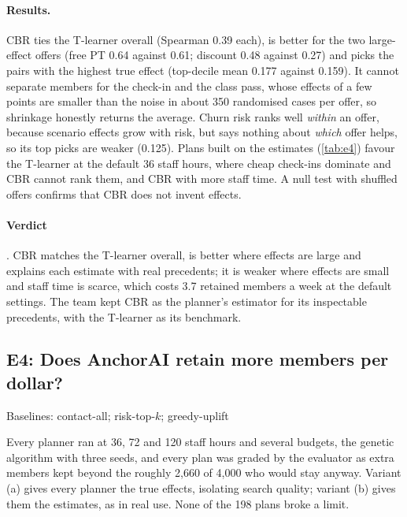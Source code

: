 \documentclass[paper=a4, fontsize=11pt, open=any, parskip=half-,
  headings=small, numbers=noenddot, captions=tableheading, toc=flat]{scrreprt}
\begin{document}
\paragraph{Results.} CBR ties the T-learner overall (Spearman 0.39 each), is better for the two large-effect offers (free PT 0.64 against 0.61; discount 0.48 against 0.27) and picks the pairs with the highest true effect (top-decile mean 0.177 against 0.159). It cannot separate members for the check-in and the class pass, whose effects of a few points are smaller than the noise in about 350 randomised cases per offer, so shrinkage honestly returns the average. Churn risk ranks well \emph{within} an offer, because scenario effects grow with risk, but says nothing about \emph{which} offer helps, so its top picks are weaker (0.125). Plans built on the estimates (\cref{tab:e4}) favour the T-learner at the default 36 staff hours, where cheap check-ins dominate and CBR cannot rank them, and CBR with more staff time. A null test with shuffled offers confirms that CBR does not invent effects.

\paragraph{Verdict} . CBR matches the T-learner overall, is better where effects are large and explains each estimate with real precedents; it is weaker where effects are small and staff time is scarce, which costs 3.7 retained members a week at the default settings. The team kept CBR as the planner's estimator for its inspectable precedents, with the T-learner as its benchmark.

\subsection{E4: Does AnchorAI retain more members per dollar?}
\label{sec:e4}
\quad\textsf{\small Baselines: contact-all; risk-top-$k$; greedy-uplift}

Every planner ran at 36, 72 and 120 staff hours and several budgets, the genetic algorithm with three seeds, and every plan was graded by the evaluator as extra members kept beyond the roughly 2,660 of 4,000 who would stay anyway. Variant (a) gives every planner the true effects, isolating search quality; variant (b) gives them the estimates, as in real use. None of the 198 plans broke a limit.
\end{document}
